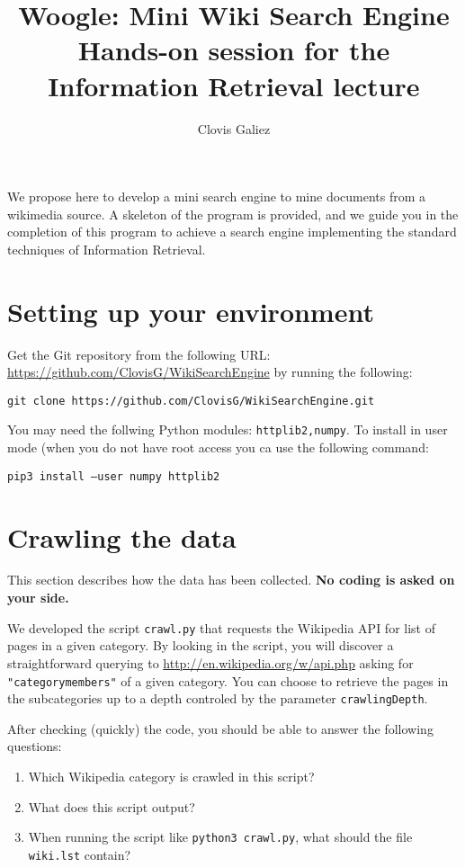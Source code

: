 \documentclass[mathserif, 11pt,c]{article}
\title{Woogle: Mini Wiki Search Engine\\
\Large Hands-on session for the Information Retrieval lecture}
\author{Clovis Galiez}
\begin{document}
\setcounter{secnumdepth}{1} 

\newcommand{\normtwo}[1]{\left|\left|#1\right|\right|_2} 
\newcommand{\normmat}[1]{\left|\left|\left|#1\right|\right|\right|} 
\newcommand{\n}[1]{\lVert #1 \rVert} 
\newcommand{\myd}[2]{ 2\log{\dfrac{\n{#1}.\n{#2}}{#1\cdot #2}}}

\maketitle


We propose here to develop a mini search engine to mine documents from a wikimedia source. A skeleton of the program is provided, and we guide you in the completion of this program to achieve a search engine implementing the standard techniques of Information Retrieval.


\section{Setting up your environment}

Get the Git repository from the following URL: \url{https://github.com/ClovisG/WikiSearchEngine} by running the following:

\texttt{git clone https://github.com/ClovisG/WikiSearchEngine.git}

You may need the follwing Python modules: \texttt{httplib2,numpy}. To install in user mode (when you do not have root access you ca use the following command:

\texttt{pip3 install --user numpy httplib2}

\section{Crawling the data}



This section describes how the data has been collected. \textbf{No coding is asked on your side.}

We developed the script \texttt{crawl.py} that requests the Wikipedia API for list of pages in a given category. By looking in the script, you will discover a straightforward querying to \url{http://en.wikipedia.org/w/api.php} asking for \texttt{"categorymembers"} of a given category. You can choose to retrieve the pages in the subcategories up to a depth controled by the parameter \texttt{crawlingDepth}.


After checking (quickly) the code, you should be able to answer the following questions:
\begin{enumerate}[label=\textbf{Q\thesection.\arabic*}]
	\item Which Wikipedia category is crawled in this script?
	\item What does this script output?
	\item When running the script like \texttt{python3 crawl.py}, what should the file \texttt{wiki.lst} contain?
\end{enumerate}
\end{document}
